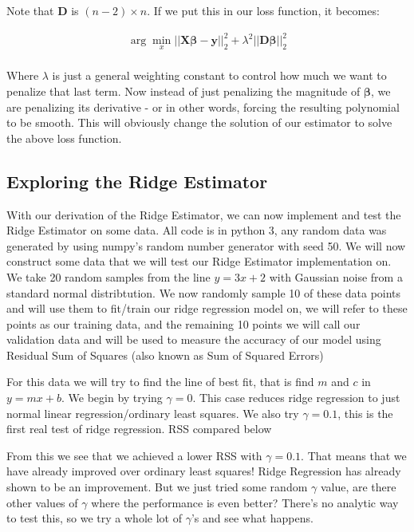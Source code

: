 \documentclass{article}
\newcommand{\y}{\mathbf{y}}
\newcommand{\X}{\mathbf{X}}
\newcommand{\B}{\boldsymbol\beta} %
\newcommand{\D}{\mathbf{D}}
\begin{document}
Note that $\D$ is $(n-2) \times n $. If we put this in our loss function, it becomes: 

\begin{align*}
\arg \min_{x} ||\X\B-\y||_{2}^{2} + \lambda^2||\D \B||_{2}^{2} \\
\end{align*}

Where $\lambda$ is just a general weighting constant to control how much we want to penalize that last term. Now instead of just penalizing the magnitude of $\B$, we are penalizing its derivative - or in other words, forcing the resulting polynomial to be smooth. This will obviously change the solution of our estimator to solve the above loss function. 

\subsection{Exploring the Ridge Estimator}

With our derivation of the Ridge Estimator, we can now implement and test the Ridge Estimator on some data.
All code is in python 3, any random data was generated by using numpy's random number generator with seed 50. We will now construct
some data that we will test our Ridge Estimator implementation on. We take 20 random samples from the line $y = 3x + 2$ with Gaussian noise from a standard
normal distribtution. We now randomly sample 10 of these data points and will use them to fit/train our ridge regression model on, we will refer to these points as our 
training data, and the remaining 10 points we will call our validation data and will be used to measure the accuracy of our model using Residual Sum of Squares (also known as Sum of Squared Errors)

For this data we will try to find the line of best fit, that is find $m$ and $c$ in $y = mx + b$. We begin by trying $\gamma = 0$. This case reduces ridge regression to 
just normal linear regression/ordinary least squares. We also try $\gamma = 0.1$, this is the first real test of ridge regression. RSS compared below

From this we see that we achieved a lower RSS with $\gamma = 0.1$. That means that we have already improved over ordinary least squares! Ridge Regression has already shown to be an improvement. 
But we just tried some random $\gamma$ value, are there other values of $\gamma$ where the performance is even better? There's no analytic way to test this,
so we try a whole lot of $\gamma$'s and see what happens.
\end{document}
